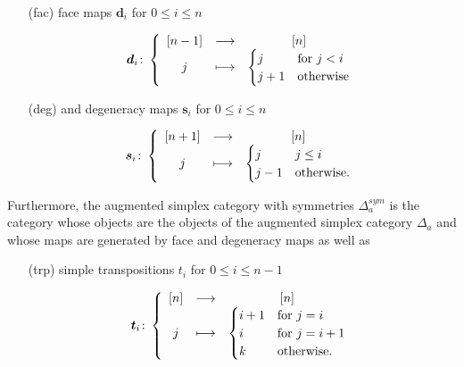 \documentclass[12pt]{amsart}
\theoremstyle{plain}
\numberwithin{lemma}{\DefaultNumberTheoremWithin}
\numberwithin{claim}{\DefaultNumberTheoremWithin}
\numberwithin{theorem}{\DefaultNumberTheoremWithin}
\numberwithin{corollary}{\DefaultNumberTheoremWithin}
\numberwithin{proposition}{\DefaultNumberTheoremWithin}
\numberwithin{conjecture}{\DefaultNumberTheoremWithin}
\theoremstyle{definition}
\theoremstyle{definition}
\numberwithin{question}{\DefaultNumberTheoremWithin}
\theoremstyle{definition}
\numberwithin{problem}{\DefaultNumberTheoremWithin}
\theoremstyle{remark}
\numberwithin{remark}{\DefaultNumberTheoremWithin}
\theoremstyle{remark}
\numberwithin{example}{\DefaultNumberTheoremWithin}
\def \la{\longrightarrow}
\def \lm{\longmapsto}
\def\for{\textnormal{for }}
\def\bd{\boldsymbol d}
\def\bs{\boldsymbol s}
\def\bt{\boldsymbol t}
\newcommand{\firstappearence}[1]{{\sf #1}}
\begin{document}
\begin{enumerate}
    \item[(fac)] \firstappearence{face maps} $\bd_i$ for $0\leq i \leq n $
    
    \medskip
    
    \begin{align*}
        \bd_i\colon \left\{ \begin{array}{ccc} [n-1]&\la & [n]    \\
        j& \lm & \begin{cases}
            j & \for j <i \\
            j+1& \textnormal{otherwise}
              \end{cases} \end{array} \right.
    \end{align*}

    \medskip
    
    \item[(deg)] and \firstappearence{degeneracy maps} $\bs_i$ for $0\leq i \leq n$

    \medskip
    
        \begin{align*}
        \bs_i\colon\left\{ \begin{array}{ccc} [n+1]&\la& [n]    \\
        j&\lm &\begin{cases}
            j & j \leq i\\
            j-1& \textnormal{otherwise}.
               \end{cases}\end{array} \right.
    \end{align*}
\end{enumerate}

Furthermore, the \firstappearence{augmented simplex category with symmetries}  $\Delta_a^ {sym}$ is the
category whose objects are the
objects of the augmented simplex category $\Delta_a$ and whose maps are generated by face and degeneracy maps as well as

\begin{enumerate}
    \item[(trp)] simple transpositions $t_i$ for $0\leq i\leq n-1$
    
        
        \begin{align*}
        \bt_i\colon \left\{ \begin{array}{ccc} [n]&\la &[n]    \\
        j&\lm &\begin{cases}
            i+1& \for j=i \\
            i& \for j=i+1 \\
            k& \textnormal{otherwise}.
        \end{cases} \end{array} \right.
    \end{align*}
\end{enumerate}
\end{document}
